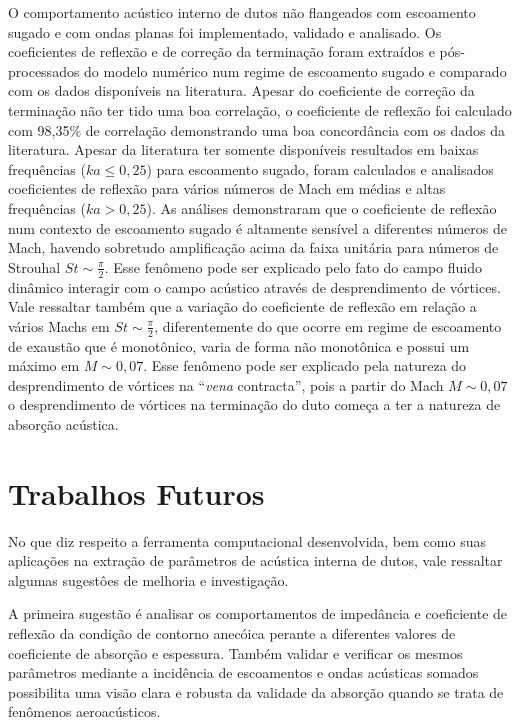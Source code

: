 O comportamento acústico interno de dutos não flangeados com escoamento sugado e com ondas planas foi implementado, validado e analisado. Os coeficientes de reflexão e de correção da terminação foram extraídos e pós-processados do modelo numérico num regime de escoamento sugado e comparado com os dados disponíveis na literatura. Apesar do coeficiente de correção da terminação não ter tido uma boa correlação, o coeficiente de reflexão foi calculado com 98,35\% de correlação demonstrando uma boa concordância com os dados da literatura. Apesar da literatura ter somente disponíveis resultados em baixas frequências ($ka \leq 0,25$) para escoamento sugado, foram calculados e analisados coeficientes de reflexão para vários números de Mach em médias e altas frequências ($ka > 0,25$). As análises demonstraram que o coeficiente de reflexão num contexto de escoamento sugado é altamente sensível a diferentes números de Mach, havendo sobretudo amplificação acima da faixa unitária para números de Strouhal $St \sim \frac{\pi}{2}$. Esse fenômeno pode ser explicado pelo fato do campo fluido dinâmico interagir com o campo acústico através de desprendimento de vórtices. Vale ressaltar também que a variação do coeficiente de reflexão em relação a vários Machs em $St \sim \frac{\pi}{2}$, diferentemente do que ocorre em regime de escoamento de exaustão que é monotônico, varia de forma não monotônica e possui um máximo em $M \sim 0,07$. Esse fenômeno pode ser explicado pela natureza do desprendimento de vórtices na ``\textit{vena} contracta'', pois a partir do Mach $M \sim 0,07$ o desprendimento de vórtices na terminação do duto começa a ter a natureza de absorção acústica.

\section{Trabalhos Futuros}

No que diz respeito a ferramenta computacional desenvolvida, bem como suas aplicações na extração de parâmetros de acústica interna de dutos, vale ressaltar algumas sugestôes de melhoria e investigação.

A primeira sugestão é analisar os comportamentos de impedância e coeficiente de reflexão da condição de contorno anecóica perante a diferentes valores de coeficiente de absorção e espessura. Também validar e verificar os mesmos parâmetros mediante a incidência de escoamentos e ondas acústicas somados possibilita uma visão clara e robusta da validade da absorção quando se trata de fenômenos aeroacústicos.

